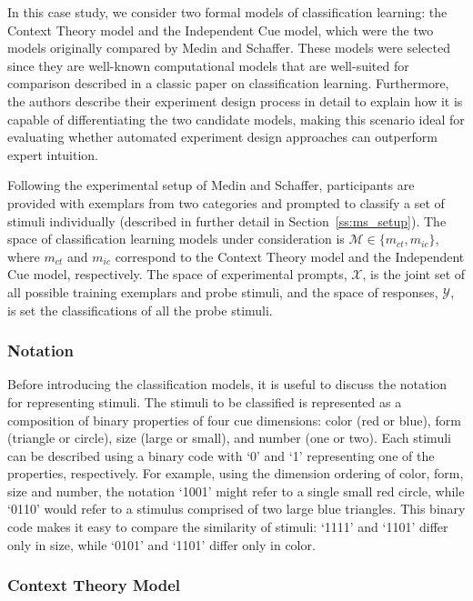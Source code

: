 \documentclass{article}
\begin{document}
In this case study, we consider two formal models of classification learning: the Context Theory model and the Independent Cue model, which were the two models originally compared by Medin and Schaffer. These models were selected since they are well-known computational models that are well-suited for comparison described in a classic paper on classification learning. Furthermore, the authors describe their experiment design process in detail to explain how it is capable of differentiating the two candidate models, making this scenario ideal for evaluating whether automated experiment design approaches can outperform expert intuition.

Following the experimental setup of Medin and Schaffer, participants are provided with exemplars from two categories and prompted to classify a set of stimuli individually (described in further detail in Section~\ref{ss:ms_setup}). The space of classification learning models under consideration is $\mathcal{M} \in \{m_{ct}, m_{ic}\}$, where $m_{ct}$ and $m_{ic}$ correspond to the Context Theory model and the Independent Cue model, respectively. The space of experimental prompts, $\mathcal{X}$, is the joint set of all possible training exemplars and probe stimuli, and the space of responses, $\mathcal{Y}$, is set the classifications of all the probe stimuli.

\subsubsection{Notation}

Before introducing the classification models, it is useful to discuss the notation for representing stimuli. The stimuli to be classified is represented as a composition of binary properties of four cue dimensions: color (red or blue), form (triangle or circle), size (large or small), and number (one or two). Each stimuli can be described using a binary code with `0' and `1' representing one of the properties, respectively. For example, using the dimension ordering of color, form, size and number, the notation `1001' might refer to a single small red circle, while `0110' would refer to a stimulus comprised of two large blue triangles. This binary code makes it easy to compare the similarity of stimuli: `1111' and `1101' differ only in size, while `0101' and `1101' differ only in color.

\subsubsection{Context Theory Model}
\end{document}
